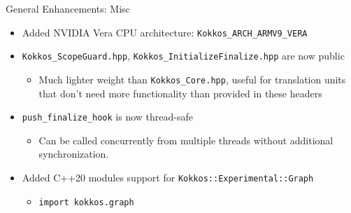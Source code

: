 \begin{frame}[fragile]{General Enhancements: Misc}
  \begin{itemize}
    \item Added NVIDIA Vera CPU architecture: \texttt{Kokkos\_ARCH\_ARMV9\_VERA}
    \vfill
    \item \texttt{Kokkos\_ScopeGuard.hpp}, \texttt{Kokkos\_InitializeFinalize.hpp} are now public
    \begin{itemize}
      \item[] Much lighter weight than \texttt{Kokkos\_Core.hpp}, useful for translation units that don't need more functionality than provided in these headers
    \end{itemize}
    \vfill
    \item \texttt{push\_finalize\_hook} is now thread-safe
    \begin{itemize}
      \item[] Can be called concurrently from multiple threads without additional synchronization.
    \end{itemize}
    \vfill
    \item Added C++20 modules support for \texttt{Kokkos::Experimental::Graph}
    \begin{itemize}
      \item[] \texttt{import kokkos.graph}
    \end{itemize}
  \end{itemize}
\end{frame}




%


